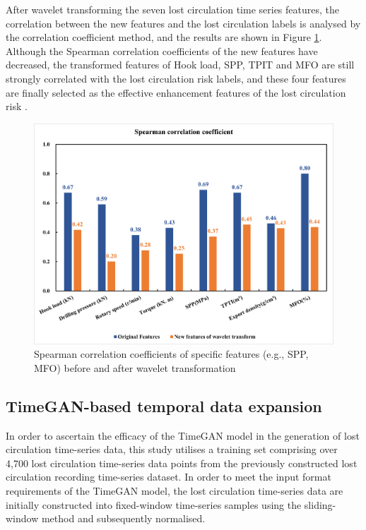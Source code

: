 \documentclass[journal,article,submit,pdftex,moreauthors]{Definitions/mdpi}
\begin{document}
After wavelet transforming the seven  lost circulation time series features, the correlation between the new features and the  lost circulation labels is analysed by the correlation coefficient method, and the results are shown in Figure  \ref{fig:Spearman correlation coefficients of features before and after wavelet transformation}. Although the Spearman correlation coefficients of the new features have decreased, the transformed features of Hook load, SPP, TPIT and MFO are still strongly correlated with the lost circulation risk labels, and these four features are finally selected as the effective enhancement features of the lost circulation risk .

\begin{figure}[h]
    \centering
    \includegraphics[width=0.75\linewidth]{图片/spearman相关系数.png}
    \caption{Spearman correlation coefficients of specific features (e.g., SPP, MFO) before and after wavelet transformation}
    \label{fig:Spearman correlation coefficients of features before and after wavelet transformation}
\end{figure}
\subsection{TimeGAN-based temporal data expansion}

In order to ascertain the efficacy of the TimeGAN model in the generation of lost circulation time-series data, this study utilises a training set comprising over 4,700 lost circulation time-series data points from the previously constructed lost circulation recording time-series dataset. In order to meet the input format requirements of the TimeGAN model, the lost circulation time-series data are initially constructed into fixed-window time-series samples using the sliding-window method and subsequently normalised. 
\end{document}
